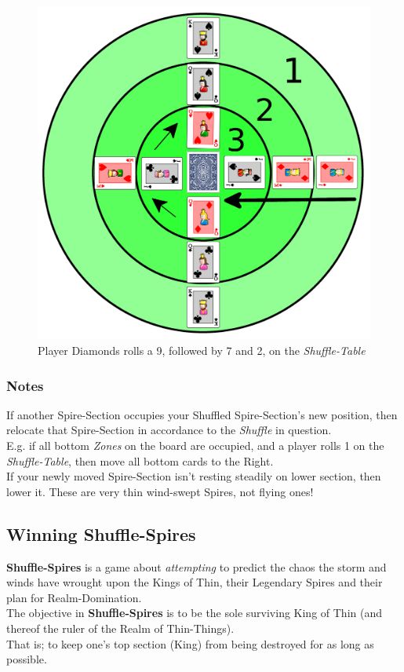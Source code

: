 \documentclass[11pt]{article} %
\begin{document}
\begin{figure}[h!]
\centering
\includegraphics[scale=0.08]{shuffle.png}
\caption{Player Diamonds rolls a 9, followed by 7 and 2, on the \textit{Shuffle-Table}}
\label{starting}
\end{figure}

\subsubsection{Notes}
If another Spire-Section occupies your Shuffled Spire-Section's new position, then relocate that Spire-Section in accordance to the \textit{Shuffle} in question. \\
E.g. if all bottom \textit{Zones} on the board are occupied, and a player rolls 1 on the \textit{Shuffle-Table}, then move all bottom cards to the Right. \\

\noindent
If your newly moved Spire-Section isn't resting steadily on lower section, then lower it. These are very thin wind-swept Spires, not flying ones!

\subsection{Winning \textbf{Shuffle-Spires}}
\textbf{Shuffle-Spires} is a game about \textit{attempting} to predict the chaos the storm and winds have wrought upon the Kings of Thin, their Legendary Spires and their plan for Realm-Domination. \\
The objective in \textbf{Shuffle-Spires} is to be the sole surviving King of Thin (and thereof the ruler of the Realm of Thin-Things). \\
That is; to keep one’s top section (King) from being destroyed for as long as possible.
\end{document}
